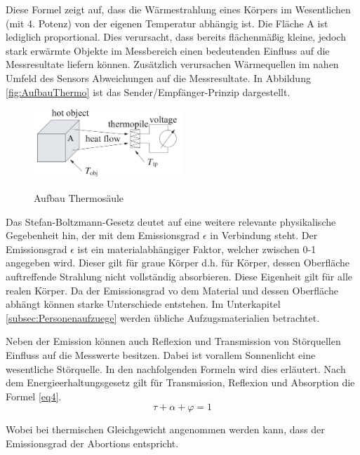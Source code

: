 Diese Formel zeigt auf, dass die Wärmestrahlung eines Körpers im Wesentlichen (mit 4. Potenz) von der eigenen Temperatur abhängig ist. Die Fläche A ist lediglich proportional. Dies verursacht, dass bereits flächenmäßig kleine, jedoch stark erwärmte Objekte im Messbereich einen bedeutenden Einfluss auf die Messresultate liefern können. Zusätzlich verursachen Wärmequellen im nahen Umfeld des Sensors Abweichungen auf die Messresultate. In Abbildung \ref{fig:AufbauThermo} ist das Sender/Empfänger-Prinzip dargestellt.

\begin{figure}[H]
	\centering
	\includegraphics[width=0.5\textwidth]
	{fig/seebeck2.PNG}
	\caption[Aufbau Thermosäule]{Aufbau Thermosäule} \protect\cite{seebeck}
	\label{fig:thermosäule}
\end{figure}


Das Stefan-Boltzmann-Gesetz deutet auf eine weitere relevante physikalische Gegebenheit hin, der mit dem Emissionsgrad $\epsilon$  in Verbindung steht. Der Emissionsgrad $\epsilon$ ist ein materialabhängiger Faktor, welcher zwischen 0-1  angegeben wird. Dieser gilt für graue Körper d.h. für Körper, dessen Oberfläche auftreffende Strahlung nicht vollständig absorbieren. Diese Eigenheit gilt für alle realen Körper. Da der Emissionsgrad vo dem Material und dessen Oberfläche abhängt können starke Unterschiede entstehen. Im Unterkapitel \ref{subsec:Personenaufzuege} werden übliche Aufzugsmaterialien betrachtet.

Neben der Emission können auch Reflexion und Transmission von Störquellen Einfluss auf die Messwerte besitzen. Dabei ist vorallem Sonnenlicht eine wesentliche Störquelle. In den nachfolgenden Formeln wird dies erläutert. Nach dem Energieerhaltungsgesetz \protect\cite{Thermoformeln} gilt für Transmission, Reflexion und Absorption die Formel \ref{eq4}.
\begin{equation}
\label{eq4}
\tau  + \alpha + \varphi  = 1
\end{equation}

Wobei bei thermischen Gleichgewicht angenommen werden kann, dass der Emissionsgrad der Abortions entspricht.

